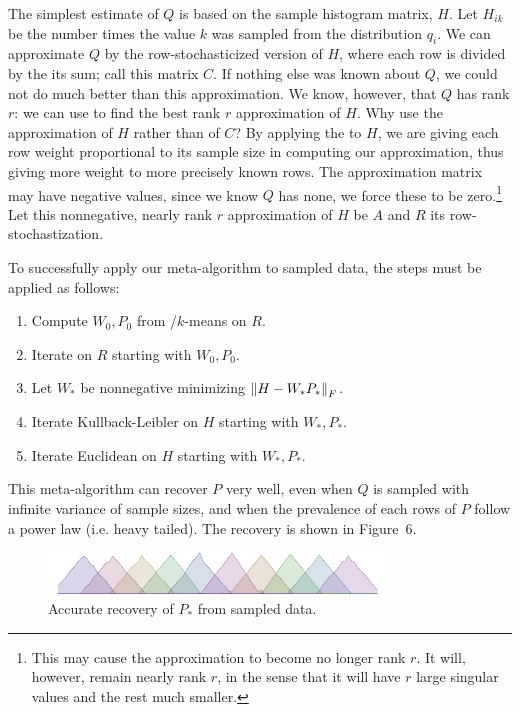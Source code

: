 \documentclass[conference]{IEEEtran}
\begin{document}
The simplest estimate of $Q$ is based on the sample histogram matrix, $H$.
Let $H_{ik}$ be the number times the value $k$ was sampled from the distribution $q_i$.
We can approximate $Q$ by the row-stochasticized version of $H$, where each row is divided by the its sum;
call this matrix $C$.
If nothing else was known about $Q$, we could not do much better than this approximation.
We know, however, that $Q$ has rank $r$:
we can use  to find the best rank $r$ approximation of $H$.
Why use the  approximation of $H$ rather than of $C$?
By applying the  to $H$, we are giving each row weight proportional to its sample size in computing our approximation, thus giving more weight to more precisely known rows.
The  approximation matrix may have negative values, since we know $Q$ has none, we force these to be zero.\footnote{This may cause the approximation to become no longer rank $r$. It will, however, remain nearly rank $r$, in the sense that it will have $r$ large singular values and the rest much smaller.}
Let this nonnegative, nearly rank $r$ approximation of $H$ be $A$ and $R$ its row-stochastization.

To successfully apply our meta-algorithm to sampled data, the steps must be applied as follows:
\begin{enumerate}
  \item Compute $W_0,P_0$ from /$k$-means on $R$.
  \item Iterate  on $R$ starting with $W_0,P_0$.
  \item Let $W_*$ be nonnegative minimizing ${\lVert H - W_* P_*\rVert}_F$. 
  \item Iterate Kullback-Leibler on $H$ starting with $W_*,P_*$.
  \item Iterate Euclidean on $H$ starting with $W_*,P_*$.
\end{enumerate}
This meta-algorithm can recover $P$ very well, even when $Q$ is sampled with infinite variance of sample sizes, and when the prevalence of each rows of $P$ follow a power law (i.e. heavy tailed). The recovery is shown in Figure~6.

\begin{figure}[t]
\begin{center}
\includegraphics[width=3.5in]{synth/S_nmf}
\end{center}
\vspace{-0.7em}
\caption{Accurate recovery of $P_*$ from sampled data.}
\vspace{-1em}
\end{figure}
\end{document}
